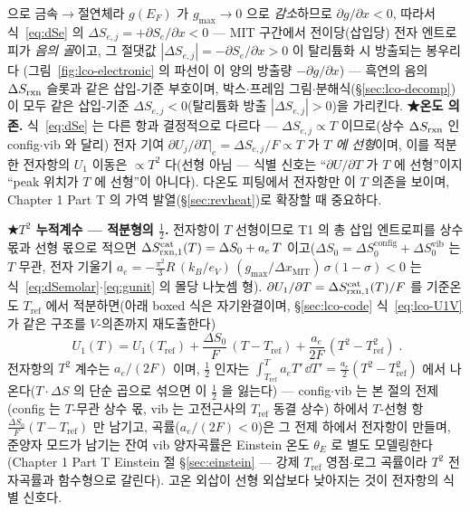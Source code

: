 으로 금속$\to$절연체라 $g(E_F)$ 가 $g_{\max}\!\to\!0$ 으로 \emph{감소}하므로 $\partial g/\partial x<0$, 따라서
식~\eqref{eq:dSe} 의 $\Delta S_{e,j}=+\partial S_e/\partial x<0$ --- MIT 구간에서 전이당(삽입당) 전자 엔트로피가
\emph{음의 골}이고, 그 절댓값 $|\Delta S_{e,j}|=-\partial S_e/\partial x>0$ 이 탈리튬화 시 방출되는 봉우리다
(그림~\ref{fig:lco-electronic} 의 파선이 이 양의 방출량 $-\partial g/\partial x$) --- 흑연의 음의 $\Delta S_{\mathrm{rxn}}$
슬롯과 같은 삽입-기준 부호이며, 박스$\cdot$프레임 그림$\cdot$분해식(\S\ref{sec:lco-decomp})이 모두 같은
삽입-기준 $\Delta S_{e,j}<0$(탈리튬화 방출 $|\Delta S_{e,j}|>0$)을 가리킨다. \textbf{★온도 의존.} 식~\eqref{eq:dSe} 는 다른 항과 결정적으로 다르다 --- $\Delta S_{e,j}\propto T$ 이므로(상수 $\Delta S_{\mathrm{rxn}}$ 인
config$\cdot$vib 와 달리) 전자 기여 $\partial U_j/\partial T|_e=\Delta S_{e,j}/F\propto T$ 가 \emph{$T$ 에 선형}이며,
이를 적분한 전자항의 $U_1$ 이동은 $\propto T^2$ 다(선형 아님 --- 식별 신호는 ``$\partial U/\partial T$ 가 $T$ 에
선형''이지 ``peak 위치가 $T$ 에 선형''이 아니다). 다온도 피팅에서 전자항만 이 $T$ 의존을 보이며, Chapter 1 Part T 의 가역 발열(\S\ref{sec:revheat})로 확장할 때 중요하다.

\textbf{★$T^2$ 누적계수 --- 적분형의 $\tfrac12$.} 전자항이 $T$ 선형이므로 T1 의 총 삽입 엔트로피를 상수 몫과 선형 몫으로 적으면
$\Delta S_{\mathrm{rxn},1}^\mathrm{cat}(T)=\Delta S_0+a_e\,T$ 이고($\Delta S_0=\Delta S_0^\mathrm{config}+
\Delta S_0^\mathrm{vib}$ 는 $T$ 무관, 전자 기울기 $a_e=-\tfrac{\pi^2}{3}R\,(k_B/e_V)\,(g_{\max}/
\Delta x_\mathrm{MIT})\,\sigma(1-\sigma)<0$ 는 식~\eqref{eq:dSemolar}$\cdot$\eqref{eq:gunit} 의 몰당 나눗셈 형).
$\partial U_1/\partial T=\Delta S_{\mathrm{rxn},1}^\mathrm{cat}(T)/F$ 를 기준온도 $T_\mathrm{ref}$ 에서 적분하면(아래 boxed 식은 자기완결이며, \S\ref{sec:lco-code} 식~\eqref{eq:lco-U1V} 가 같은 구조를 $V$-의존까지 재도출한다)
\begin{equation}
\boxed{\;U_1(T)=U_1(T_\mathrm{ref})+\frac{\Delta S_0}{F}\,(T-T_\mathrm{ref})+\frac{a_e}{2F}\,(T^2-T_\mathrm{ref}^2)\;.}
\label{eq:U1T2}
\end{equation}
전자항의 $T^2$ 계수는 $a_e/(2F)$ 이며, $\tfrac12$ 인자는 $\int_{T_\mathrm{ref}}^{T}a_e T'\,\dd T'=\tfrac{a_e}{2}
(T^2-T_\mathrm{ref}^2)$ 에서 나온다($T\cdot\Delta S$ 의 단순 곱으로 섞으면 이 $\tfrac12$ 을 잃는다) --- config$\cdot$vib 는
본 절의 전제(config 는 $T$-무관 상수 몫, vib 는 고전근사의 $T_\mathrm{ref}$ 동결 상수) 하에서
$T$-선형 항 $\tfrac{\Delta S_0}{F}(T-T_\mathrm{ref})$ 만 남기고, 곡률($a_e/(2F)<0$)은 그 전제 하에서
전자항이 만들며, 준양자 모드가 남기는 잔여 vib 양자곡률은 Einstein 온도 $\theta_E$ 로 별도
모델링한다(Chapter 1 Part T Einstein 절 \S\ref{sec:einstein} --- 강제 $T_\mathrm{ref}$ 영점$\cdot$로그 곡률이라 $T^2$ 전자곡률과 함수형으로
갈린다). 고온 외삽이 선형 외삽보다 낮아지는 것이 전자항의 식별 신호다.

